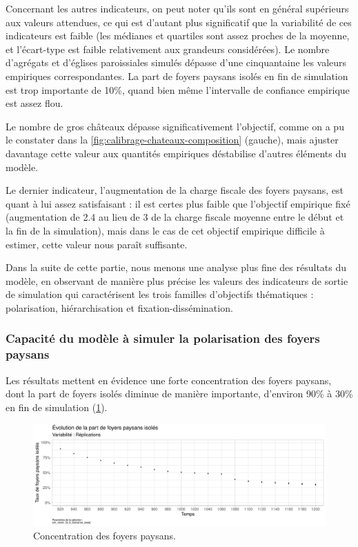 Concernant les autres indicateurs, on peut noter qu'ils sont en général supérieurs aux valeurs attendues, ce qui est d'autant plus significatif que la variabilité de ces indicateurs est faible (les médianes et quartiles sont assez proches de la moyenne, et l'écart-type est faible relativement aux grandeurs considérées).
Le nombre d'agrégats et d'églises paroissiales simulés dépasse d'une cinquantaine les valeurs empiriques correspondantes.
La part de foyers paysans isolés en fin de simulation est trop importante de 10\%, quand bien même l'intervalle de confiance empirique est assez flou.

Le nombre de gros châteaux dépasse significativement l'objectif, comme on a pu le constater dans la \cref{fig:calibrage-chateaux-composition} (gauche), mais ajuster davantage cette valeur aux quantités empiriques déstabilise d'autres éléments du modèle.

Le dernier indicateur, l'augmentation de la charge fiscale des foyers paysans, est quant à lui assez satisfaisant : il est certes plus faible que l'objectif empirique fixé (augmentation de 2.4 au lieu de 3 de la charge fiscale moyenne entre le début et la fin de la simulation), mais dans le cas de cet objectif empirique difficile à estimer, cette valeur nous paraît suffisante.

Dans la suite de cette partie, nous menons une analyse plus fine des résultats du modèle, en observant de manière plus précise les valeurs des indicateurs de sortie de simulation qui caractérisent les \og trois familles\fg{} d'objectifs thématiques : polarisation, hiérarchisation et fixation-dissémination.

\subsubsection{Capacité du modèle à simuler la polarisation des foyers paysans}

Les résultats mettent en évidence une forte concentration des foyers paysans, dont la part de foyers isolés diminue de manière importante, d'environ 90\% à 30\% en fin de simulation (\cref{fig:results-concentration-fp}).

\begin{figure}[H]
	\centering
	\includegraphics[width=\linewidth]{img/results_6_6/FP_Concentration_Haut.pdf}
	\caption{Concentration des foyers paysans.}
	\label{fig:results-concentration-fp}
\end{figure}

